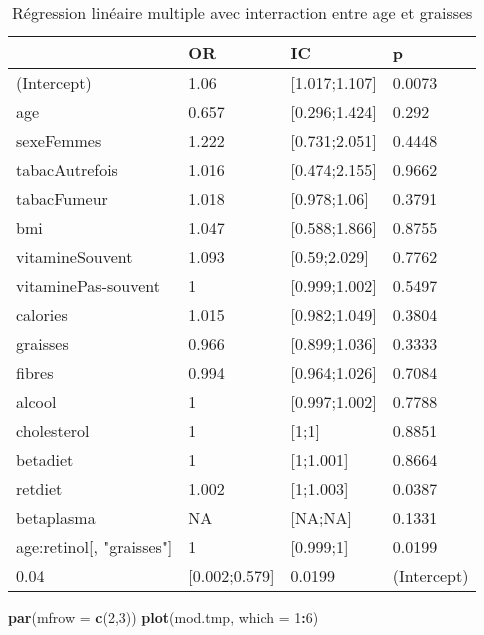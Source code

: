 \documentclass[]{article}
\newenvironment{Shaded}{\begin{snugshade}}{\end{snugshade}}
\newcommand{\KeywordTok}[1]{\textcolor[rgb]{0.13,0.29,0.53}{\textbf{#1}}}
\newcommand{\DataTypeTok}[1]{\textcolor[rgb]{0.13,0.29,0.53}{#1}}
\newcommand{\DecValTok}[1]{\textcolor[rgb]{0.00,0.00,0.81}{#1}}
\newcommand{\OperatorTok}[1]{\textcolor[rgb]{0.81,0.36,0.00}{\textbf{#1}}}
\newcommand{\NormalTok}[1]{#1}
\begin{document}
\begin{table}

\caption{\label{tab:unnamed-chunk-83}Régression linéaire multiple avec interraction entre age et graisses}
\centering
\begin{tabular}[t]{l|l|l|l}
\hline
  & OR & IC & p\\
\hline
\rowcolor[HTML]{BBD2E1}  (Intercept) & 1.06 & [1.017;1.107] & 0.0073\\
\hline
age & 0.657 & [0.296;1.424] & 0.292\\
\hline
\rowcolor[HTML]{BBD2E1}  sexeFemmes & 1.222 & [0.731;2.051] & 0.4448\\
\hline
tabacAutrefois & 1.016 & [0.474;2.155] & 0.9662\\
\hline
\rowcolor[HTML]{BBD2E1}  tabacFumeur & 1.018 & [0.978;1.06] & 0.3791\\
\hline
bmi & 1.047 & [0.588;1.866] & 0.8755\\
\hline
\rowcolor[HTML]{BBD2E1}  vitamineSouvent & 1.093 & [0.59;2.029] & 0.7762\\
\hline
vitaminePas-souvent & 1 & [0.999;1.002] & 0.5497\\
\hline
\rowcolor[HTML]{BBD2E1}  calories & 1.015 & [0.982;1.049] & 0.3804\\
\hline
graisses & 0.966 & [0.899;1.036] & 0.3333\\
\hline
\rowcolor[HTML]{BBD2E1}  fibres & 0.994 & [0.964;1.026] & 0.7084\\
\hline
alcool & 1 & [0.997;1.002] & 0.7788\\
\hline
\rowcolor[HTML]{BBD2E1}  cholesterol & 1 & [1;1] & 0.8851\\
\hline
betadiet & 1 & [1;1.001] & 0.8664\\
\hline
\rowcolor[HTML]{BBD2E1}  retdiet & 1.002 & [1;1.003] & 0.0387\\
\hline
betaplasma & NA & [NA;NA] & 0.1331\\
\hline
\rowcolor[HTML]{BBD2E1}  age:retinol[, "graisses"] & 1 & [0.999;1] & 0.0199\\
\hline
0.04 & [0.002;0.579] & 0.0199 & (Intercept)\\
\hline
\end{tabular}
\end{table}

\begin{Shaded}
\begin{Highlighting}[]
\KeywordTok{par}\NormalTok{(}\DataTypeTok{mfrow =} \KeywordTok{c}\NormalTok{(}\DecValTok{2}\NormalTok{,}\DecValTok{3}\NormalTok{))}
\KeywordTok{plot}\NormalTok{(mod.tmp, }\DataTypeTok{which =} \DecValTok{1}\OperatorTok{:}\DecValTok{6}\NormalTok{)}
\end{Highlighting}
\end{Shaded}
\end{document}
